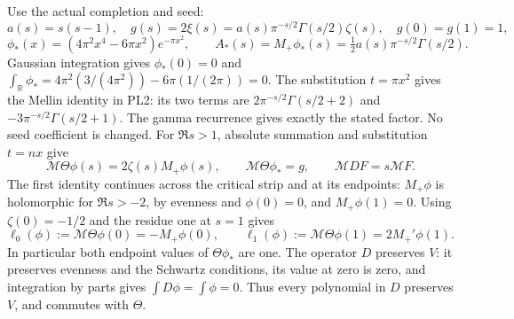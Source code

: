 Use the actual completion and seed:
\[
 a(s)=s(s-1),\quad
 g(s)=2\xi(s)=a(s)\pi^{-s/2}\Gamma(s/2)\zeta(s),\quad g(0)=g(1)=1,
\]
\[
 \phi_*(x)=(4\pi^2x^4-6\pi x^2)e^{-\pi x^2},\qquad
 A_*(s)=M_+\phi_*(s)=\tfrac12a(s)\pi^{-s/2}\Gamma(s/2).
 \tag{PL2}\label{pl:pl:seed}
\]
Gaussian integration gives \(\phi_*(0)=0\) and
\(\int_{\mathbb R}\phi_*=4\pi^2(3/(4\pi^2))-6\pi(1/(2\pi))=0\).
The substitution \(t=\pi x^2\) gives the Mellin identity in PL2:
its two terms are \(2\pi^{-s/2}\Gamma(s/2+2)\) and
\(-3\pi^{-s/2}\Gamma(s/2+1)\). The gamma recurrence gives exactly
the stated factor. No seed coefficient is changed.
For \(\Re s>1\), absolute summation and substitution \(t=nx\) give
\[
 \mathcal M\Theta\phi(s)=2\zeta(s)M_+\phi(s),\qquad
 \mathcal M\Theta\phi_*=g,\qquad \mathcal M DF=s\mathcal M F.
 \tag{PL3}\label{pl:pl:theta-mellin}
\]
The first identity continues across the critical strip and at its
endpoints: \(M_+\phi\) is holomorphic for \(\Re s>-2\), by evenness
and \(\phi(0)=0\), and \(M_+\phi(1)=0\).
Using \(\zeta(0)=-1/2\) and the residue one at \(s=1\) gives
\[
 \ell_0(\phi):=\mathcal M\Theta\phi(0)=-M_+\phi(0),\qquad
 \ell_1(\phi):=\mathcal M\Theta\phi(1)=2M_+'\phi(1).
 \tag{PL4}\label{pl:pl:logmoments}
\]
In particular both endpoint values of \(\Theta\phi_*\) are one.
The operator \(D\) preserves \(V\): it preserves evenness and the
Schwartz conditions, its value at zero is zero, and integration by
parts gives \(\int D\phi=\int\phi=0\). Thus every polynomial in \(D\)
preserves \(V\), and commutes with \(\Theta\).

